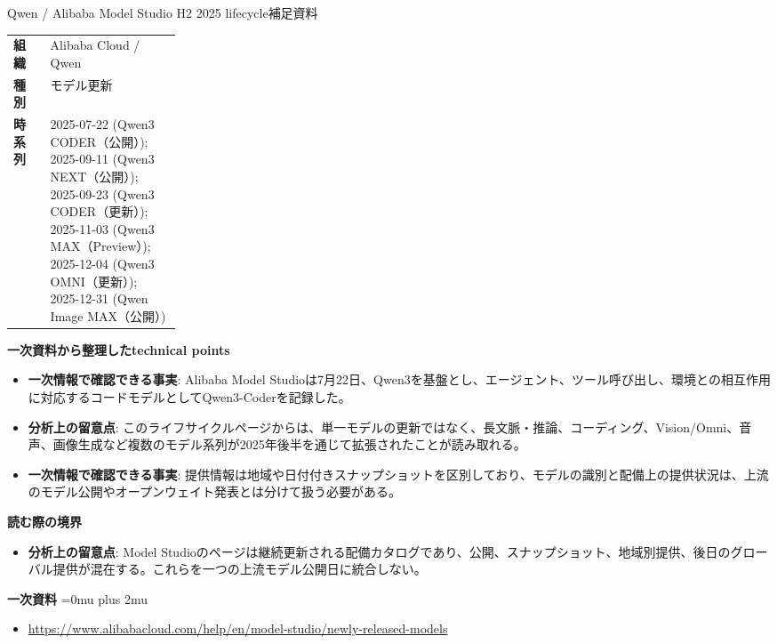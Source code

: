 \begin{technicalnote}{Qwen / Alibaba Model Studio H2 2025 lifecycle}{補足資料}
\begingroup
\begin{tabularx}{\linewidth}{@{}>{\bfseries}p{0.22\linewidth}X@{}}
組織 & Alibaba Cloud / Qwen \\
種別 & モデル更新 \\
時系列 & 2025-07-22 (Qwen3 CODER（公開）); 2025-09-11 (Qwen3 NEXT（公開）); 2025-09-23 (Qwen3 CODER（更新）); 2025-11-03 (Qwen3 MAX（Preview）); 2025-12-04 (Qwen3 OMNI（更新）); 2025-12-31 (Qwen Image MAX（公開）) \\
\end{tabularx}
\smallskip
{\bfseries 一次資料から整理したtechnical points}
\begin{itemize}[leftmargin=1.5em,itemsep=0.35em]
\item \textbf{一次情報で確認できる事実}: Alibaba Model Studioは7月22日、Qwen3を基盤とし、エージェント、ツール呼び出し、環境との相互作用に対応するコードモデルとしてQwen3-Coderを記録した。
\item \textbf{分析上の留意点}: このライフサイクルページからは、単一モデルの更新ではなく、長文脈・推論、コーディング、Vision/Omni、音声、画像生成など複数のモデル系列が2025年後半を通じて拡張されたことが読み取れる。
\item \textbf{一次情報で確認できる事実}: 提供情報は地域や日付付きスナップショットを区別しており、モデルの識別と配備上の提供状況は、上流のモデル公開やオープンウェイト発表とは分けて扱う必要がある。
\end{itemize}
\begin{minipage}{\linewidth}
{\bfseries 読む際の境界}
\begin{itemize}[leftmargin=1.5em,itemsep=0.35em]
\item \textbf{分析上の留意点}: Model Studioのページは継続更新される配備カタログであり、公開、スナップショット、地域別提供、後日のグローバル提供が混在する。これらを一つの上流モデル公開日に統合しない。
\end{itemize}
\begin{samepage}
{\bfseries 一次資料}
\begingroup\sloppy
\Urlmuskip=0mu plus 2mu\relax
\begin{itemize}[leftmargin=1.5em,itemsep=0.25em]
\item {\scriptsize\url{https://www.alibabacloud.com/help/en/model-studio/newly-released-models}}
\end{itemize}
\endgroup
\end{samepage}
\end{minipage}
\endgroup
\end{technicalnote}
\medskip

